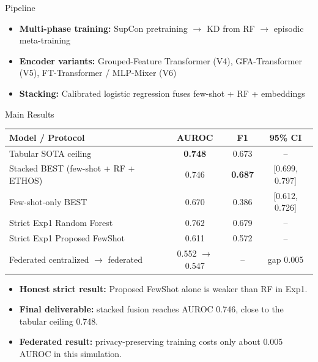 \documentclass[aspectratio=169,11pt]{beamer}
\begin{document}
\begin{frame}{Pipeline}
\begin{center}
\end{center}
\begin{itemize}
\item \textbf{Multi-phase training:} SupCon pretraining $\to$ KD from RF $\to$ episodic meta-training
\item \textbf{Encoder variants:} Grouped-Feature Transformer (V4), GFA-Transformer (V5), FT-Transformer / MLP-Mixer (V6)
\item \textbf{Stacking:} Calibrated logistic regression fuses few-shot + RF + embeddings
\end{itemize}
\end{frame}

\begin{frame}{Main Results}
\begin{table}
\centering
\small
\begin{tabular}{lccc}
\toprule
Model / Protocol & AUROC & F1 & 95\% CI \\
\midrule
Tabular SOTA ceiling & \textbf{0.748} & 0.673 & -- \\
Stacked BEST (few-shot + RF + ETHOS) & 0.746 & \textbf{0.687} & [0.699, 0.797] \\
Few-shot-only BEST & 0.670 & 0.386 & [0.612, 0.726] \\
Strict Exp1 Random Forest & 0.762 & 0.679 & -- \\
Strict Exp1 Proposed FewShot & 0.611 & 0.572 & -- \\
Federated centralized $\to$ federated & 0.552 $\to$ 0.547 & -- & gap 0.005 \\
\bottomrule
\end{tabular}
\end{table}
\begin{itemize}
\item \textbf{Honest strict result:} Proposed FewShot alone is weaker than RF in Exp1.
\item \textbf{Final deliverable:} stacked fusion reaches AUROC 0.746, close to the tabular ceiling 0.748.
\item \textbf{Federated result:} privacy-preserving training costs only about 0.005 AUROC in this simulation.
\end{itemize}
\end{frame}
\end{document}
